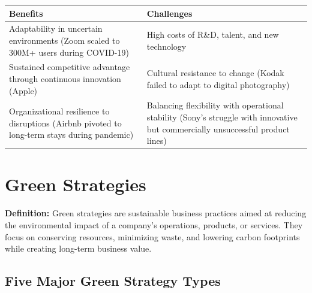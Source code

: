 \documentclass[11pt, letterpaper]{article}
\begin{document}
\begin{center}
\begin{tabular}{p{6.5cm} p{6.5cm}}
\toprule
\textbf{Benefits} & \textbf{Challenges} \\
\midrule
Adaptability in uncertain environments (Zoom scaled to 300M+ users during COVID-19) & High costs of R\&D, talent, and new technology \\
Sustained competitive advantage through continuous innovation (Apple) & Cultural resistance to change (Kodak failed to adapt to digital photography) \\
Organizational resilience to disruptions (Airbnb pivoted to long-term stays during pandemic) & Balancing flexibility with operational stability (Sony's struggle with innovative but commercially unsuccessful product lines) \\
\bottomrule
\end{tabular}
\end{center}

\newpage

\section{Green Strategies}

\begin{defbox}
\textbf{Definition:} Green strategies are sustainable business practices aimed at reducing the environmental impact of a company's operations, products, or services. They focus on conserving resources, minimizing waste, and lowering carbon footprints while creating long-term business value.
\end{defbox}

\subsection{Five Major Green Strategy Types}
\end{document}
